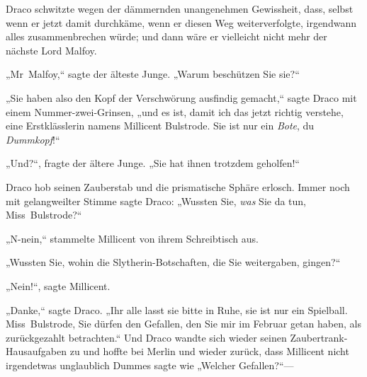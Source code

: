 Draco schwitzte wegen der dämmernden unangenehmen Gewissheit, dass, selbst wenn er jetzt damit durchkäme, wenn er diesen Weg weiterverfolgte, irgendwann alles zusammenbrechen würde; und dann wäre er vielleicht nicht mehr der nächste Lord Malfoy.

„Mr~Malfoy,“ sagte der älteste Junge. „Warum beschützen Sie sie?“

„Sie haben also den Kopf der Verschwörung ausfindig gemacht,“ sagte Draco mit einem Nummer-zwei-Grinsen, „und es ist, damit ich das jetzt richtig verstehe, eine Erstklässlerin namens Millicent Bulstrode. Sie ist nur ein \emph{Bote}, du \emph{Dummkopf}!“

„Und?“, fragte der ältere Junge. „Sie hat ihnen trotzdem geholfen!“

Draco hob seinen Zauberstab und die prismatische Sphäre erlosch. Immer noch mit gelangweilter Stimme sagte Draco: „Wussten Sie, \emph{was} Sie da tun, Miss~Bulstrode?“

„N-nein,“ stammelte Millicent von ihrem Schreibtisch aus.

„Wussten Sie, wohin die Slytherin-Botschaften, die Sie weitergaben, gingen?“

„Nein!“, sagte Millicent.

„Danke,“ sagte Draco. „Ihr alle lasst sie bitte in Ruhe, sie ist nur ein Spielball. Miss~Bulstrode, Sie dürfen den Gefallen, den Sie mir im Februar getan haben, als zurückgezahlt betrachten.“ Und Draco wandte sich wieder seinen Zaubertrank-Hausaufgaben zu und hoffte bei Merlin und wieder zurück, dass Millicent nicht irgendetwas unglaublich Dummes sagte wie „Welcher Gefallen?“—

